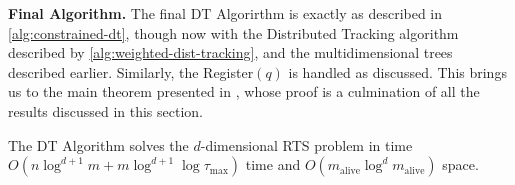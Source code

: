 \textbf{Final Algorithm.} The final DT Algorirthm is exactly as described in \cref{alg:constrained-dt}, though now with the Distributed Tracking algorithm described by \cref{alg:weighted-dist-tracking}, and the multidimensional trees described earlier. Similarly, the Register$(q)$ is handled as discussed. This brings us to the main theorem presented in \cite{GAN16}, whose proof is a culmination of all the results discussed in this section. 

\begin{theorem}
    The DT Algorithm solves the $d$-dimensional RTS problem in time $O(n\log^{d+1}m + m\log^{d+1}\log\tau_{\max})$ time and  $O(m_{\text{alive}}\log^d m_{\text{alive}})$ space. 
\end{theorem}
